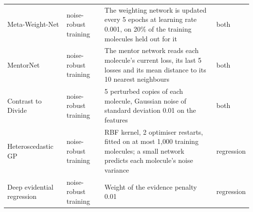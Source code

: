 {\begin{longtable}{@{}p{2.9cm}p{2.0cm}p{7.3cm}p{1.6cm}@{}}
Meta-Weight-Net & noise-robust training & The weighting network is updated every 5 epochs at learning rate 0.001, on 20\% of the training molecules held out for it & both \\
MentorNet & noise-robust training & The mentor network reads each molecule's current loss, its last 5 losses and its mean distance to its 10 nearest neighbours & both \\
Contrast to Divide & noise-robust training & 5 perturbed copies of each molecule, Gaussian noise of standard deviation 0.01 on the features & both \\
\midrule
Heteroscedastic GP & noise-robust training & RBF kernel, 2 optimiser restarts, fitted on at most 1{,}000 training molecules; a small network predicts each molecule's noise variance & regression \\
Deep evidential regression & noise-robust training & Weight of the evidence penalty 0.01 & regression \\
\bottomrule
\end{longtable}
}

